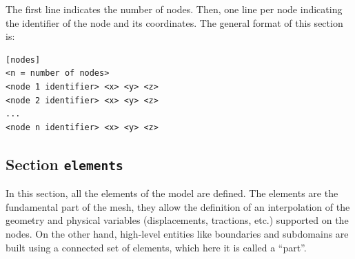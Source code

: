 \documentclass[a4paper,fleqn]{book}
\begin{document}
The first line indicates the number of nodes. Then, one line per node indicating the identifier of the node and its coordinates. The general format of this section is:
\begin{Verbatim}[frame=single, fontsize=\small, label={general format of section [nodes]}]
[nodes]
<n = number of nodes>
<node 1 identifier> <x> <y> <z>
<node 2 identifier> <x> <y> <z>
...
<node n identifier> <x> <y> <z>
\end{Verbatim} 

\subsection{Section \texttt{elements}}

In this section, all the elements of the model are defined. The elements are the fundamental part of the mesh, they allow the definition of an interpolation of the geometry and physical variables (displacements, tractions, etc.) supported on the nodes. On the other hand, high-level entities like boundaries and subdomains are built using a connected set of elements, which here it is called a ``part''. 
\end{document}
